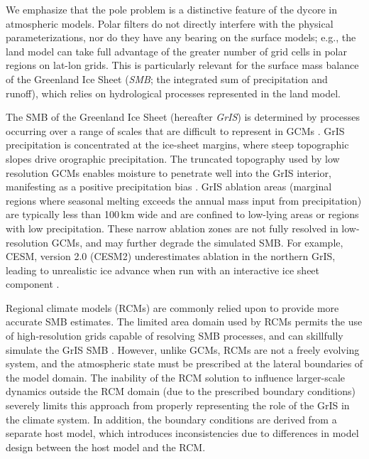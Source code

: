 \documentclass[draft]{agujournal2019}
\begin{document}
We emphasize that the pole problem is a distinctive feature of the dycore in atmospheric models. Polar filters do not directly interfere with the physical parameterizations, nor do they have any bearing on the surface models; e.g., the land model can take full advantage of the greater number of grid cells in polar regions on lat-lon grids. This is particularly relevant for the surface mass balance of the Greenland Ice Sheet (\textit{SMB}; the integrated sum of precipitation and runoff), which relies on hydrological processes represented in the land model.

The SMB of the Greenland Ice Sheet (hereafter \textit{GrIS}) is determined by processes occurring over a range of scales that are difficult to represent in GCMs \cite{P2010CC}. GrIS precipitation is concentrated at the ice-sheet margins, where steep topographic slopes drive orographic precipitation. The truncated topography used by low resolution GCMs enables moisture to penetrate well into the GrIS interior, manifesting as a positive precipitation bias \cite{P2000GPC,VETAL2018TC}. GrIS ablation areas (marginal regions where seasonal melting exceeds the annual mass input from precipitation) are typically less than 100\,km wide and are confined to low-lying areas or regions with low precipitation. These narrow ablation zones are not fully resolved in low-resolution GCMs, and may further degrade the simulated SMB. For example, CESM, version 2.0 (CESM2) underestimates ablation in the northern GrIS, leading to unrealistic ice advance when run with an interactive ice sheet component \cite{LETAL2020JAMES}.

Regional climate models (RCMs) are commonly relied upon to provide more accurate SMB estimates. The limited area domain used by RCMs permits the use of high-resolution grids capable of resolving SMB processes, and can skillfully simulate the GrIS SMB \cite{BETAL2004JGR,RETAL2012TC,VETAL2012TC,FETAL2013TC,METAL2017LTS,NETAL2018TC}. However, unlike GCMs, RCMs are not a freely evolving system, and the atmospheric state must be prescribed at the lateral boundaries of the model domain. The inability of the RCM solution to influence larger-scale dynamics outside the RCM domain (due to the prescribed boundary conditions) severely limits this approach from properly representing the role of the GrIS in the climate system. In addition, the boundary conditions are derived from a separate host model, which introduces inconsistencies due to differences in model design between the host model and the RCM.
\end{document}

